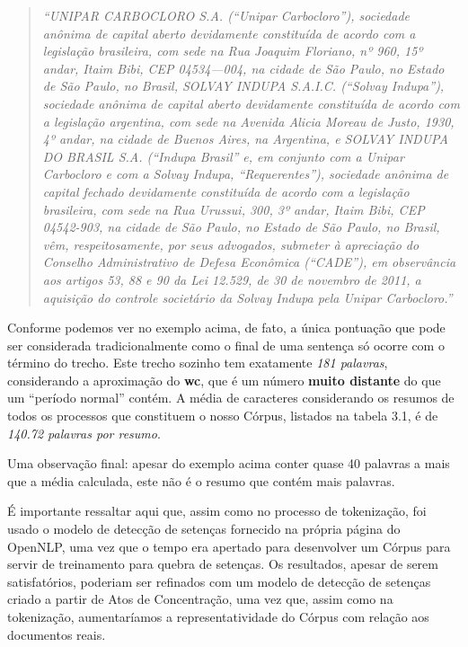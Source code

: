 \documentclass[11pt]{report}
\newcommand{\quotes}[1]{``#1''}
\begin{document}
\begin{quote}
  \textit{\quotes{UNIPAR CARBOCLORO S.A. (“Unipar Carbocloro”), sociedade anônima de capital aberto devidamente constituída de acordo com a legislação brasileira, com sede na Rua
  Joaquim Floriano, nº 960, 15º andar, Itaim Bibi, CEP 04534—004, na cidade de São Paulo, no Estado de São Paulo, no Brasil, SOLVAY INDUPA S.A.I.C. (“Solvay Indupa”),
  sociedade anônima de capital aberto devidamente constituída de acordo com a legislação argentina, com sede na Avenida Alicia Moreau de Justo, 1930, 4º andar, na cidade de
  Buenos Aires, na Argentina, e SOLVAY INDUPA DO BRASIL S.A. (“Indupa Brasil” e, em conjunto com a Unipar Carbocloro e com a Solvay Indupa, “Requerentes”), sociedade anônima
  de capital fechado devidamente constituída de acordo com a legislação brasileira, com sede na Rua Urussui, 300, 3º andar, Itaim Bibi, CEP 04542-903, na cidade de São Paulo,
  no Estado de São Paulo, no Brasil, vêm, respeitosamente, por seus advogados, submeter à apreciação do Conselho Administrativo de Defesa Econômica (“CADE”), em observância aos
  artigos 53, 88 e 90 da Lei 12.529, de 30 de novembro de 2011, a aquisição do controle societário da Solvay Indupa pela Unipar Carbocloro.}}
\end{quote}

Conforme podemos ver no exemplo acima, de fato, a única pontuação que pode ser considerada tradicionalmente como o final de uma sentença só ocorre com o término do trecho. Este trecho
sozinho tem exatamente \textit{181 palavras}, considerando a aproximação do \textbf{wc}, que é um número \textbf{muito distante} do que um \quotes{período normal} contém. A média
de caracteres considerando os resumos de todos os processos que constituem o nosso Córpus, listados na tabela 3.1, é de \textit{140.72 palavras por resumo}.

Uma observação final: apesar do exemplo acima conter quase 40 palavras a mais que a média calculada, este não é o resumo que contém mais palavras.

É importante ressaltar aqui que, assim como no processo de tokenização, foi usado o modelo de detecção de setenças fornecido na própria página do OpenNLP, uma vez que o tempo era
apertado para desenvolver um Córpus para servir de treinamento para quebra de setenças. Os resultados, apesar de serem satisfatórios, poderiam ser refinados com um modelo
de detecção de setenças criado a partir de Atos de Concentração, uma vez que, assim como na tokenização, aumentaríamos a representatividade do Córpus com relação aos documentos
reais.
\end{document}
